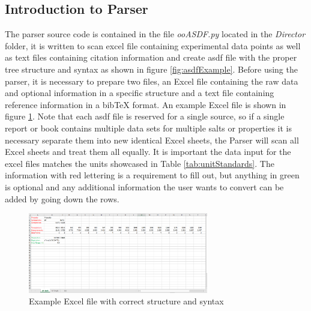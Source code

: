 \subsection{Introduction to Parser}
The parser source code is contained in the file \textit{ooASDF.py} located in the \textit{Director} folder, it is written to scan excel file containing experimental data points as well as text files containing citation information and create asdf file with the proper tree structure and syntax as shown in figure \ref{fig:asdfExample}. Before using the parser, it is necessary to prepare two files, an Excel file containing the raw data and optional information in a specific structure and a text file containing reference information in a bibTeX format. An example Excel file is shown in figure \ref{fig:excelEx}. Note that each asdf file is reserved for a single source, so if a single report or book contains multiple data sets for multiple salts or properties it is necessary separate them into new identical  Excel sheets, the Parser will scan all Excel sheets and treat them all equally. It is important the data input for the excel files matches the units showcased in Table \ref{tab:unitStandards}. The information with red lettering is a requirement to fill out, but anything in green is optional and any additional information the user wants to convert can be added by going down the rows.

\begin{figure}[h]
    \centering
    \includegraphics[width = 0.7\textwidth]{msdf/figures/excelEx.PNG}
    \caption{Example Excel file with correct structure and syntax}
    \label{fig:excelEx}
\end{figure}

